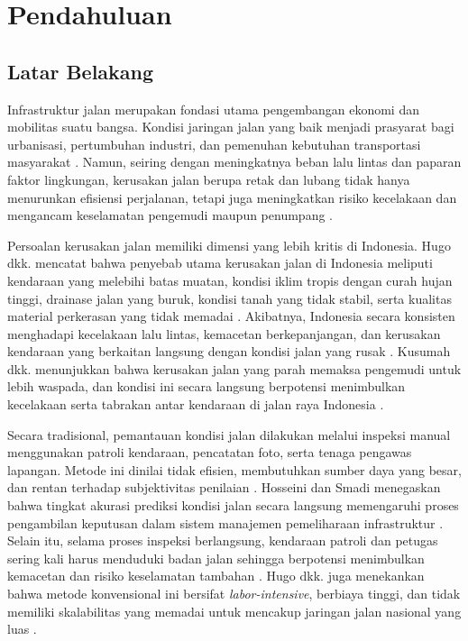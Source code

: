 \chapter{Pendahuluan}
\section{Latar Belakang}

Infrastruktur jalan merupakan fondasi utama pengembangan ekonomi dan mobilitas suatu bangsa.
Kondisi jaringan jalan yang baik menjadi prasyarat bagi urbanisasi, pertumbuhan industri,
dan pemenuhan kebutuhan transportasi masyarakat \cite{Zeng2024, radopoulou2015detection}.
Namun, seiring dengan meningkatnya beban lalu lintas dan paparan faktor lingkungan,
kerusakan jalan berupa retak dan lubang tidak hanya menurunkan efisiensi
perjalanan, tetapi juga meningkatkan risiko kecelakaan dan mengancam keselamatan pengemudi
maupun penumpang \cite{Li2024}.

Persoalan kerusakan jalan memiliki dimensi yang lebih kritis di Indonesia.
Hugo dkk. mencatat bahwa penyebab utama kerusakan jalan di
Indonesia meliputi kendaraan yang melebihi batas muatan, kondisi iklim
tropis dengan curah hujan tinggi, drainase jalan yang buruk, kondisi tanah
yang tidak stabil, serta kualitas material perkerasan yang tidak memadai
\cite{hugo2025efficientdet}. Akibatnya, Indonesia secara konsisten
menghadapi kecelakaan lalu lintas, kemacetan berkepanjangan, dan kerusakan
kendaraan yang berkaitan langsung dengan kondisi jalan yang rusak
\cite{hugo2025efficientdet}. Kusumah dkk. menunjukkan bahwa kerusakan
jalan yang parah memaksa pengemudi untuk lebih waspada, dan kondisi ini secara langsung
berpotensi menimbulkan kecelakaan serta tabrakan antar kendaraan di jalan raya Indonesia
\cite{kusumah2023deep}.

Secara tradisional, pemantauan kondisi jalan dilakukan melalui inspeksi manual menggunakan
patroli kendaraan, pencatatan foto, serta tenaga pengawas lapangan. Metode ini dinilai tidak
efisien, membutuhkan sumber daya yang besar, dan rentan terhadap subjektivitas penilaian
\cite{Li2024}. Hosseini dan Smadi menegaskan bahwa tingkat akurasi prediksi kondisi jalan
secara langsung memengaruhi proses pengambilan keputusan dalam sistem manajemen pemeliharaan
infrastruktur \cite{hosseini2021prediction}. Selain itu, selama proses inspeksi berlangsung,
kendaraan patroli dan petugas sering kali harus menduduki badan jalan sehingga berpotensi
menimbulkan kemacetan dan risiko keselamatan tambahan \cite{Li2024}. Hugo dkk.
juga menekankan bahwa metode konvensional ini bersifat \textit{labor-intensive}, berbiaya
tinggi, dan tidak memiliki skalabilitas yang memadai untuk mencakup jaringan jalan nasional
yang luas \cite{hugo2025efficientdet}.

